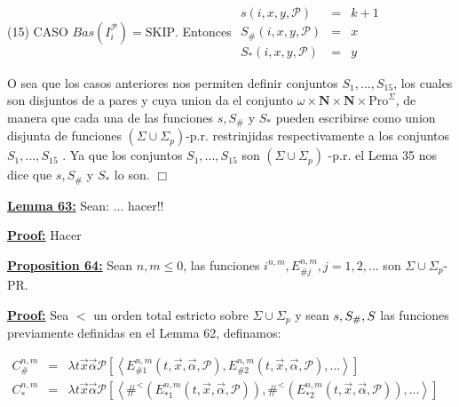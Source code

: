 (15) CASO \(Bas(I_{i}^{\mathcal{P}})=\mathrm{SKIP}\). Entonces
\(\displaystyle \begin{array}{rcl} s(i,x,y,\mathcal{P}) & =& k+1 \\ S_{\#}(i,x,y,\mathcal{P}) & =& x \\ S_{\ast }(i,x,y,\mathcal{P}) & =& y \end{array} \)

O sea que los casos anteriores nos permiten definir conjuntos \( S_{1},...,S_{15}\), los cuales son disjuntos de a pares y cuya union da el conjunto \(\omega \times \mathbf{N}\times \mathbf{N}\times \mathrm{Pro} ^{\Sigma }\), de manera que cada una de las funciones \(s,S_{\#}\) y \(S_{\ast }\) pueden escribirse como union disjunta de funciones \((\Sigma \cup \Sigma _{p}) \)-p.r. restrinjidas respectivamente a los conjuntos \(S_{1},...,S_{15}\) . Ya que los conjuntos \(S_{1},...,S_{15}\) son \((\Sigma \cup \Sigma _{p})\) -p.r. el Lema 35 nos dice que \(s,S_{\#}\) y \(S_{\ast }\) lo son. \(\Box\)


\textbf{\underline{Lemma 63:}} Sean: ... hacer!!

\textbf{\underline{Proof:}} Hacer

\textbf{\underline{Proposition 64:}} Sean $n, m \leq 0$, las funciones $i^{n, m}, E_{\#j}^{n, m}, j = 1, 2, ...$ son
  $\Sigma \cup \Sigma_{p}$-PR.

\textbf{\underline{Proof:}} Sea $<$ un orden total estricto sobre $\Sigma \cup \Sigma_{p}$ y sean $s, S_{\#}, S_{\*}$ las funciones previamente definidas en el Lemma 62, definamos:

\(\displaystyle \begin{array}{rcl} C_{\#}^{n,m} & =& \lambda t\vec{x}\vec{\alpha}\mathcal{P}\left[ \left\langle E_{\#1}^{n,m}(t,\vec{x},\vec{\alpha},\mathcal{P}),E_{\#2}^{n,m}(t,\vec{x}, \vec{\alpha},\mathcal{P}),...\right\rangle \right] \\ C_{\ast }^{n,m} & =& \lambda t\vec{x}\vec{\alpha}\mathcal{P}\left[ \left\langle \#^{< }(E_{\ast 1}^{n,m}(t,\vec{x},\vec{\alpha},\mathcal{P} )),\#^{< }(E_{\ast 2}^{n,m}(t,\vec{x},\vec{\alpha},\mathcal{P} )),...\right\rangle \right] \end{array} \)

